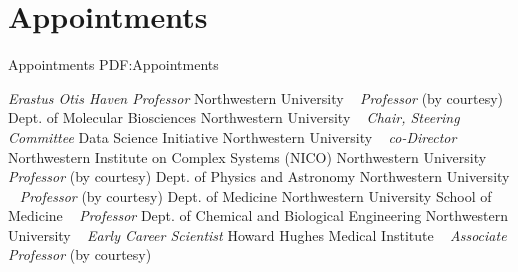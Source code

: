 \section
{Appointments}
{Appointments}
{PDF:Appointments}

\textit{Erastus Otis Haven Professor} 
\newline
Northwestern University
\newline
~
\Gap
{}
\textit{Professor} (by courtesy)
    \newline
    Dept. of Molecular Biosciences
\newline
Northwestern University
\newline
~
\Gap
{}
\textit{Chair, Steering Committee} 
    \newline
    Data Science Initiative
\newline
Northwestern University
\newline
~
\Gap
{}
\textit{co-Director} 
    \newline
    Northwestern Institute on Complex Systems (NICO)
\newline
Northwestern University
\newline
~
\Gap
{}
\textit{Professor} (by courtesy)
    \newline
    Dept. of Physics and Astronomy
\newline
Northwestern University
\newline
~
\Gap
{}
\textit{Professor} (by courtesy)
    \newline
    Dept. of Medicine
\newline
Northwestern University School of Medicine
\newline
~
\Gap
{}
\textit{Professor} 
    \newline
    Dept. of Chemical and Biological Engineering
\newline
Northwestern University
\newline
~
\Gap
{}
\textit{Early Career Scientist} 
\newline
Howard Hughes Medical Institute
\newline
~
\Gap
{}
\textit{Associate Professor} (by courtesy)
    \newline
